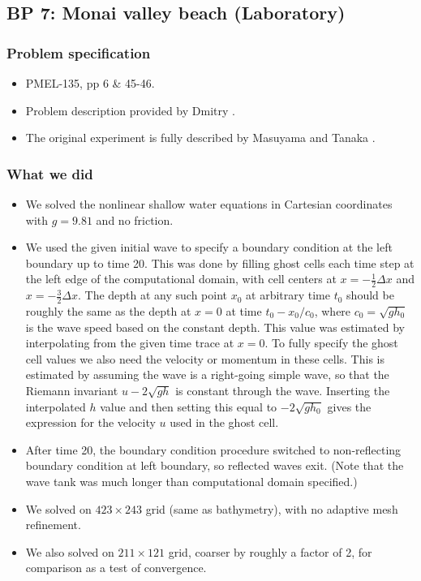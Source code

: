 
\subsection{BP 7:
 Monai valley beach (Laboratory)}

\subsubsection{Problem specification}

\begin{itemize}

\item PMEL-135, pp 6 \& 45-46.

\item Problem description provided by Dmitry \cite{bp7description}.

\item The original experiment is fully described by Masuyama and Tanaka
\cite{MatsuyamaTanaka:monai}.

\end{itemize} 

\subsubsection{What we did}

\begin{itemize}
\item We solved the nonlinear shallow water equations in Cartesian
coordinates with $g=9.81$ and no friction.  
\item We used the given initial wave to specify a boundary condition at the left
boundary up to time 20.  This was done by filling ghost cells each time step
at the left edge of the computational domain, with cell centers at $x = -
\frac 1 2 \Delta x$ and $x = -\frac 3 2 \Delta x$.
The depth at any such point $x_0$ at arbitrary time $t_0$ should be roughly
the same as the depth at $x=0$ at time $t_0 - x_0/c_0$, where $c_0 =
\sqrt{gh_0}$ is the wave speed based on the constant depth.  This value was
estimated by 
interpolating from the given time trace at $x=0$.
To fully specify the ghost cell values we also need the velocity or momentum
in these cells.  This is estimated by assuming the wave is a right-going
simple wave, so that the Riemann invariant $u - 2\sqrt{gh}$ is constant
through the wave.  Inserting the interpolated $h$ value and then setting this
equal to $-2\sqrt{gh_0}$ gives the expression for the velocity $u$ used in
the ghost cell.

\item After time 20, the boundary condition procedure
switched to non-reflecting boundary condition 
at left boundary, so reflected waves exit.  
(Note that the wave tank was much longer than computational domain specified.)
\item We solved on $423\times 243$ grid (same as bathymetry), with no
adaptive mesh refinement.
\item We also solved on $211\times 121$ grid, coarser by roughly a factor of
2, for comparison as a test of convergence.
\end{itemize} 

